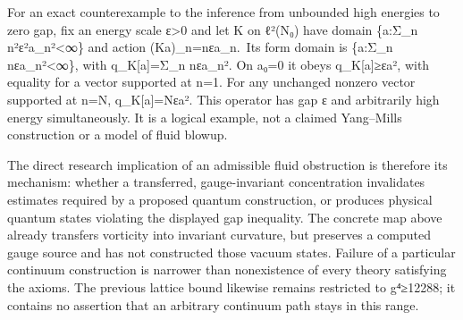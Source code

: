 For an exact counterexample to the inference from unbounded high
energies to zero gap, fix an energy scale ε\textgreater0 and let K on
ℓ²(N₀) have domain \{a:Σ\_n n²ε²\textbar a\_n\textbar²\textless∞\} and
action (Ka)\_n=nεa\_n.~Its form domain is \{a:Σ\_n
nε\textbar a\_n\textbar²\textless∞\}, with q\_K{[}a{]}=Σ\_n
nε\textbar a\_n\textbar². On a₀=0 it obeys
q\_K{[}a{]}≥ε\textbar\textbar a\textbar\textbar², with equality for a
vector supported at n=1. For any unchanged nonzero vector supported at
n=N, q\_K{[}a{]}=Nε\textbar\textbar a\textbar\textbar². This operator
has gap ε and arbitrarily high energy simultaneously. It is a logical
example, not a claimed Yang--Mills construction or a model of fluid
blowup.

The direct research implication of an admissible fluid obstruction is
therefore its mechanism: whether a transferred, gauge-invariant
concentration invalidates estimates required by a proposed quantum
construction, or produces physical quantum states violating the
displayed gap inequality. The concrete map above already transfers
vorticity into invariant curvature, but preserves a computed gauge
source and has not constructed those vacuum states. Failure of a
particular continuum construction is narrower than nonexistence of every
theory satisfying the axioms. The previous lattice bound likewise
remains restricted to g⁴≥12288; it contains no assertion that an
arbitrary continuum path stays in this range.
